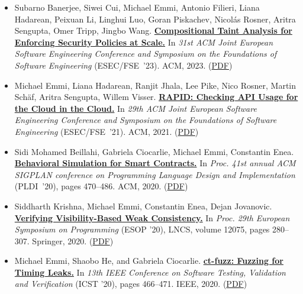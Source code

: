 \documentclass{article}
\begin{document}
  \begin{itemize}[leftmargin=0cm,label={}]

    \item Subarno Banerjee, Siwei Cui, Michael Emmi, Antonio Filieri, Liana Hadarean, Peixuan Li, Linghui Luo, Goran Piskachev, Nicolás Rosner, Aritra Sengupta, Omer Tripp, Jingbo Wang. {\bf\href{%
    https://doi.org/10.1145/3611643.3613889}{%
    Compositional Taint Analysis for Enforcing Security Policies at Scale.}} In \emph{ 31st ACM Joint European Software Engineering Conference and Symposium on the Foundations of Software Engineering } (ESEC/FSE ’23). ACM, 2023. (\href{https://michael-emmi.github.io/https://github.com/michael-emmi/research-papers/raw/master/conf-sigsoft-BanerjeeCEFHLLPRSTW23.pdf}{PDF})


    \item Michael Emmi, Liana Hadarean, Ranjit Jhala, Lee Pike, Nico Rosner, Martin Schäf, Aritra Sengupta, Willem Visser. {\bf\href{%
    https://doi.org/10.1145/3468264.3473934}{%
    RAPID: Checking API Usage for the Cloud in the Cloud.}} In \emph{ 29th ACM Joint European Software Engineering Conference and Symposium on the Foundations of Software Engineering } (ESEC/FSE ’21). ACM, 2021. (\href{https://michael-emmi.github.io/https://github.com/michael-emmi/research-papers/raw/master/conf-sigsoft-EmmiHJPRSSV21.pdf}{PDF})


    \item Sidi Mohamed Beillahi, Gabriela Ciocarlie, Michael Emmi, Constantin Enea. {\bf\href{%
    https://doi.org/10.1145/3385412.3386022}{%
    Behavioral Simulation for Smart Contracts.}} In \emph{ Proc. 41st annual ACM SIGPLAN conference on Programming Language Design and Implementation } (PLDI ’20), pages 470–486. ACM, 2020. (\href{https://michael-emmi.github.io/https://github.com/michael-emmi/research-papers/raw/master/conf-pldi-BeillahiCEE20.pdf}{PDF})


    \item Siddharth Krishna, Michael Emmi, Constantin Enea, Dejan Jovanovic. {\bf\href{%
    https://doi.org/10.1007/978-3-030-44914-8_11}{%
    Verifying Visibility-Based Weak Consistency.}} In \emph{ Proc. 29th European Symposium on Programming } (ESOP ’20), LNCS, volume 12075, pages 280–307. Springer, 2020. (\href{https://michael-emmi.github.io/https://github.com/michael-emmi/research-papers/raw/master/conf-esop-KrishnaEEJ20.pdf}{PDF})


    \item Michael Emmi, Shaobo He, and Gabriela Ciocarlie. {\bf\href{%
    https://doi.org/10.1109/ICST46399.2020.00063}{%
    ct-fuzz: Fuzzing for Timing Leaks.}} In \emph{ 13th IEEE Conference on Software Testing, Validation and Verification } (ICST ’20), pages 466–471. IEEE, 2020. (\href{https://michael-emmi.github.io/https://github.com/michael-emmi/research-papers/raw/master/conf-icst-HeEC20.pdf}{PDF})



\end{itemize}
\end{document}
